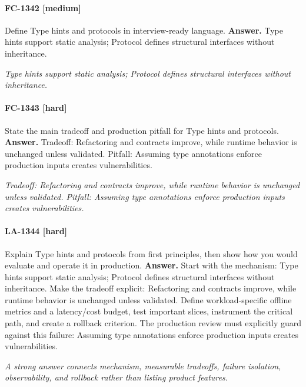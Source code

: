 \paragraph{FC-1342 [medium]} Define Type hints and protocols in interview-ready language.
\noindent\textbf{Answer.} Type hints support static analysis; Protocol defines structural interfaces without inheritance.
\par\textit{Type hints support static analysis; Protocol defines structural interfaces without inheritance.}
\paragraph{FC-1343 [hard]} State the main tradeoff and production pitfall for Type hints and protocols.
\noindent\textbf{Answer.} Tradeoff: Refactoring and contracts improve, while runtime behavior is unchanged unless validated. Pitfall: Assuming type annotations enforce production inputs creates vulnerabilities.
\par\textit{Tradeoff: Refactoring and contracts improve, while runtime behavior is unchanged unless validated. Pitfall: Assuming type annotations enforce production inputs creates vulnerabilities.}
\paragraph{LA-1344 [hard]} Explain Type hints and protocols from first principles, then show how you would evaluate and operate it in production.
\noindent\textbf{Answer.} Start with the mechanism: Type hints support static analysis; Protocol defines structural interfaces without inheritance. Make the tradeoff explicit: Refactoring and contracts improve, while runtime behavior is unchanged unless validated. Define workload-specific offline metrics and a latency/cost budget, test important slices, instrument the critical path, and create a rollback criterion. The production review must explicitly guard against this failure: Assuming type annotations enforce production inputs creates vulnerabilities.
\par\textit{A strong answer connects mechanism, measurable tradeoffs, failure isolation, observability, and rollback rather than listing product features.}
